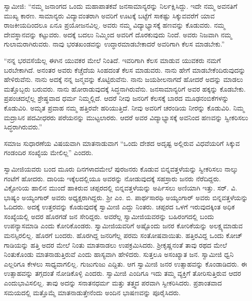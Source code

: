  ಸ್ವಾಮೀಜಿ: “ನಮ್ಮ ಜನಾಂಗದ ಒಂದು ಮಹಾಪಾತಕವೆ ಜನಸಾಮಾನ್ಯರನ್ನು ನಿರ್ಲಕ್ಷಿಸಿದ್ದು. ಇದೇ ನಮ್ಮ ಅವನತಿಗೆ ಮುಖ್ಯ ಕಾರಣ. ಸಾಮಾನ್ಯರು ವಿದ್ಯಾವಂತರಾಗಿ ಅವರಿಗೆ ಊಟಕ್ಕೆ ಬಟ್ಟೆಗೆ ಸಾಕಷ್ಟು ಸಿಕ್ಕುವವರೆಗೆ ಯಾವ ರಾಜಕೀಯದಿಂದಲೂ ಏನೂ ಪ್ರಯೋಜನವಿಲ್ಲ. ಅವರು ನಮ್ಮ ವಿದ್ಯಾಭ್ಯಾಸಕ್ಕೆ ಹಣವನ್ನು ಕೊಡುವರು. ನಮ್ಮ ದೇವಸ್ಥಾನವನ್ನು ಕಟ್ಟುವರು. ಅದಕ್ಕೆ ಬದಲು ನಿಮ್ಮಿಂದ ಅವರಿಗೆ ದೊರಕುವುದು ನಿಂದೆ. ಅವರು ನಿಜವಾಗಿ ನಮ್ಮ ಗುಲಾಮರಾಗಿರುವರು. ನಾವು ಭರತಖಂಡವನ್ನು ಉದ್ಧಾರಮಾಡಬೇಕಾದರೆ ಅವರಿಗಾಗಿ ಕೆಲಸ ಮಾಡಬೇಕು.” 

 “ನನ್ನ ಭರವಸೆಯೆಲ್ಲ ಈಗಿನ ಯುವಕರ ಮೇಲೆ ನಿಂತಿದೆ. ಇವರಿಗಾಗಿ ಕೆಲಸ ಮಾಡುವ ಯುವಕರು ನಮಗೆ ಬರಬೇಕಾಗಿದೆ. ಅನಂತರ ಅವರು ಕೆಚ್ಚೆದೆಯ ಸಿಂಹದಂತೆ ಕೆಲಸ ಮಾಡುವರು. ನಾನು ಹೇಗೆ ಮಾಡಬೇಕೆಂದಿರುವುದನ್ನು ಹೇಳಿರುವೆನು. ನಾನು ಅದಕ್ಕೆ ನನ್ನ ಜನ್ಮವನ್ನು ಕೊಟ್ಟಿರುವೆನು. ನಾನು ಜಯಶೀಲನಾಗದೆ ಹೋದರೆ ಅದನ್ನು ಮಾಡಲು ಮತ್ತೊಬ್ಬರು ಬರುವರು. ನಾನು ಹೋರಾಡುವುದಕ್ಕೆ ಸಿದ್ಧನಾಗಿರುವೆನು. ಜನಸಾಮಾನ್ಯರಿಗೆ ಅವರ ಹಕ್ಕನ್ನು ಕೊಡಬೇಕು. ಪ್ರಪಂಚದಲ್ಲೆಲ್ಲ ಶ್ರೇಷ್ಥವಾದ ಧರ್ಮ ನಿಮ್ಮಲ್ಲಿದೆ. ಆದರೆ ನೀವು ಜನರಿಗೆ ಕೆಲಸಕ್ಕೆ ಬಾರದ ಮೂಢನಂಬಿಕೆಗಳನ್ನು ಕೊಡುವಿರಿ. ಅಮೃತ ಪ್ರವಾಹ ನಮ್ಮ ಹತ್ತಿರವೇ ಹರಿಯುತ್ತಿದೆ. ನೀವು ಅವರಿಗೆ ಚರಂಡಿಯ ನೀರನ್ನು ಕೊಡುವಿರಿ. ನಿಮ್ಮ ಮದ್ರಾಸಿನ ಪದವೀಧರರು ಪರೆಯನನ್ನು ಮುಟ್ಟಲಾರರು. ಆದರೆ ಅವರ ವಿದ್ಯಾಭ್ಯಾಸಕ್ಕೆ ಅವನಿಂದ ಹಣವನ್ನು ಸ್ವೀಕರಿಸಲು ಸಿದ್ಧರಾಗಿರುವರು.” 

 ಸಮಾಜ ಸುಧಾರಣೆಯ ವಿಷಯವಾಗಿ ಮಾತನಾಡುವಾಗ “ಒಂದು ದೇಶದ ಅದೃಷ್ಟ ಅಲ್ಲಿರುವ ವಿಧವೆಯರಿಗೆ ಸಿಕ್ಕುವ ಗಂಡಂದಿರ ಸಂಖ್ಯೆಯ ಮೇಲಿಲ್ಲ” ಎಂದರು. 

 ಸ್ವಾಮೀಜಿಯವರು ಬಂದ ಮೂರು ದಿನಗಳಾದಮೇಲೆ ಪುರಜನರು ಕೊಡುವ ಬಿನ್ನವತ್ತಳೆಯನ್ನು ಸ್ವೀಕರಿಸಲು ನಾಲ್ಕು ಗಂಟೆಗೆ ಹೋದರು. ದಾರಿಯ ಇಕ್ಕೆಲದಲ್ಲಿಯೂ ಅವರನ್ನು ನೋಡುವುದಕ್ಕೆ ಸಹಸ್ರಾರು ಜನರು ನೆರೆದಿದ್ದರು. ವಿಕ್ಟೋರಿಯ ಹಾಲಿನ ಮುಂದೆ ಹಾಕಿರುವ ಚಪ್ಪರದಲ್ಲಿ ಬಿನ್ನವತ್ತಳೆಯನ್ನು ಅರ್ಪಿಸಲು ಅಣಿಯಾಗಿ ಇತ್ತು. ಸರ್. ವಿ. ಭಾಷ್ಯಂ ಅಯ್ಯಂಗಾರ್ ಅವರು ಅಧ್ಯಕ್ಷರಾಗಿದ್ದರು. ಶ‍್ರೀ ಎಂ. ಬಿ. ಪಾರ್ಥಸಾರಥಿ ಅಯ್ಯಂಗಾರ್ ಅವರು ಬಿನ್ನವತ್ತಳೆಯನ್ನು ಓದಿದರು. ಅದಕ್ಕೆ ಉತ್ತರವನ್ನು ಕೊಡುವುದಕ್ಕೆ ಸ್ವಾಮೀಜಿ ಎದ್ದು ನಿಂತರು. ಚಪ್ಪರದ ಒಳಗೆ ಇರುವುದಕ್ಕಿಂತ ಅಧಿಕ ಸಂಖ್ಯೆಯಲ್ಲಿ ಅದರ ಹೊರಗಡೆ ಜನ ಸೇರಿದ್ದರು. ಅವರೆಲ್ಲ ಸ್ವಾಮೀಜಿಯವರನ್ನು ಬಹಿರಂಗದಲ್ಲಿ ಬಂದು ಉಪನ್ಯಾಸಮಾಡಿ ಎಂದು ಕೋರಿಕೊಂಡರು. ಸ್ವಾಮೀಜಿಯವರಿಗೆ ಅಷ್ಟೊಂದು ಜನರ ಕೋರಿಕೆಯನ್ನು ಅಲಕ್ಷ್ಯಮಾಡುವ ಮನಸ್ಸಿರಲಿಲ್ಲ. ಹೊರಗೆ ಬಂದರು. ಹೊರಗಿದ್ದ ಜನರಿಗೆಲ್ಲ ಪರಮ ಸಂತೋಷವಾಯಿತು. ಹತ್ತಿರವಿದ್ದ ಒಂದು ಕೋಚ್ ಗಾಡಿಯನ್ನು ಹತ್ತಿ ಅದರ ಮೇಲೆ ನಿಂತು ಮಾತನಾಡಲು ಉಪಕ್ರಮಿಸಿದರು. ಶ‍್ರೀಕೃಷ್ಣನಂತೆ ತಾವು ರಥದ ಮೇಲೆ ನಿಂತುಕೊಂಡು ಮಾತನಾಡುತ್ತಿರುವೆ ಎಂದು ಹಾಸ್ಯವಾಗಿ ಹೇಳಿದರು. ಸುತ್ತಲೂ ಅಸಂಖ್ಯಾತ ಜನ. ಸ್ವಾಮೀಜಿ ಧ್ವನಿ ಎಲ್ಲರಿಗೂ ಕೇಳಲು ಸಾಧ್ಯವಾಗಲಿಲ್ಲ. ಗುಜುಗುಜು ಎದ್ದಿತು. ಆಗ ಸ್ವಾಮೀಜಿ ಜನರ ಉತ್ಸಾಹವನ್ನು ಕೊಂಡಾಡಿದರು. ಈ ಉತ್ಸಾಹವನ್ನು ತಗ್ಗದಂತೆ ನೋಡಿಕೊಳ್ಳಿ ಎಂದರು. ಸ್ವಾಮೀಜಿ ಎಂದಿಗೂ ಇದು ತಮ್ಮ ವ್ಯಕ್ತಿಗೆ ತೋರಿಸುತ್ತಿರುವ ಆದರ ಎಂದು\break ಭಾವಿಸಲಿಲ್ಲ. ತಾವು ಅದನ್ನು ಸನಾತನಧರ್ಮ ಮತ್ತು ತತ್ತ್ವದ ಪರವಾಗಿ ಸ್ವೀಕರಿಸಿದರು. ಪ್ರಶಾಂತವಾದ ಸಮಯದಲ್ಲಿ ಮತ್ತೊಮ್ಮೆ ಮಾತನಾಡುತ್ತೇನೆಂದು ಅಂದಿನ ಭಾಷಣವನ್ನು ಪೂರೈಸಿದರು. 

